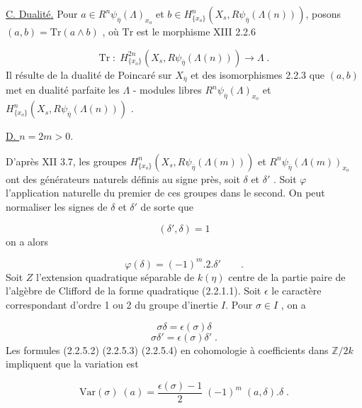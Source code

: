 \underline{C. Dualité.} Pour $a \in R^n\psi_{\overline{\eta}}(\Lambda)_{x_o}$ et $b \in H^n_{\{x_o\}}(X_s,R\psi_{\overline{\eta}}(\Lambda(n)))$, posons $(a,b) = \mathrm{Tr}(a \wedge b)$ , où $\mathrm{Tr}$ est le morphisme XIII 2.2.6

\begin{equation*}
\mathrm{Tr} \; : \; H^{2n}_{\{x_o\}}(X_s,R\psi_{\bar\eta}(\Lambda(n))) \longrightarrow \Lambda \;.
\end{equation*}
Il résulte de la dualité de Poincaré sur $X_{\overline{\eta}}$ et des isomorphismes 2.2.3 que $(a,b)$ met en dualité parfaite les $\Lambda$ - modules libres $R^n\psi_{\overline{\eta}}(\Lambda)_{x_o}$ et $H^n_{\{x_o\}}(X_s,R\psi_{\overline{\eta}}(\Lambda(n)))$ .


\underline{D. \quad $n = 2m > 0$}.

D'après XII 3.7, les groupes $H^n_{\{x_o\}}(X_s,R\psi_{\overline{\eta}}(\Lambda(m)))$ et $R^n\psi_{\overline{\eta}}(\Lambda(m))_{x_o}$ ont des générateurs naturels définis au signe près, soit $\delta$ et $\delta'$ . Soit $\varphi$ l'application naturelle du premier de ces groupes dans le second. On peut normaliser les signes de $\delta$ et $\delta'$ de sorte que

\begin{equation}\tag{2.2.5.2}
(\delta',\delta) = 1
\end{equation}
on a alors

\begin{equation}\tag{2.2.5.3}
\varphi(\delta) = (-1)^m . 2 . \delta' \qquad .
\end{equation}
Soit $Z$ l'extension quadratique séparable de $k(\eta)$ centre de la partie paire de l'algèbre de Clifford de la forme quadratique (2.2.1.1). Soit $\epsilon$ le caractère correspondant d'ordre 1 ou 2 du groupe d'inertie $I$. Pour $\sigma \in I$ , on a

\begin{equation}\tag{2.2.5.4}
\sigma\delta = \epsilon(\sigma)\delta
\end{equation}
\begin{equation}\tag{2.2.5.5}
\sigma\delta' = \epsilon(\sigma)\delta' \;.
\end{equation}
Les formules (2.2.5.2) (2.2.5.3) (2.2.5.4) en cohomologie à coefficients dans $\mathbb{Z}/2k$ impliquent que la variation est

\begin{equation}\tag{2.2.5.6}
\mathrm{Var}(\sigma) \; (a) = \frac{\epsilon(\sigma)-1}{2} \; (-1)^m \; (a,\delta).\delta \;.
\end{equation}

